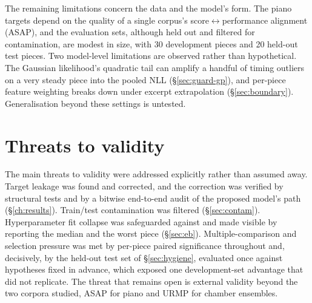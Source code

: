 The remaining limitations concern the data and the model's form. The piano
targets depend on the quality of a single corpus's
score$\leftrightarrow$performance alignment (ASAP), and the evaluation sets,
although held out and filtered for contamination, are modest in size, with
30 development pieces and 20 held-out test pieces. Two model-level
limitations are observed rather than hypothetical. The Gaussian likelihood's
quadratic tail can amplify a handful of timing outliers on a very steady
piece into the pooled NLL (\S\ref{sec:guard-gp}), and per-piece feature
weighting breaks down under excerpt extrapolation (\S\ref{sec:boundary}).
Generalisation beyond these settings is untested.

\section{Threats to validity}
The main threats to validity were addressed explicitly rather than assumed
away. Target leakage was found and corrected, and the correction was
verified by structural tests and by a bitwise end-to-end audit of the
proposed model's path (\S\ref{ch:results}). Train/test contamination was
filtered (\S\ref{sec:contam}). Hyperparameter fit collapse was safeguarded
against and made visible by reporting the median and the worst piece
(\S\ref{sec:eb}). Multiple-comparison and selection pressure was met by
per-piece paired significance throughout and, decisively, by the held-out
test set of \S\ref{sec:hygiene}, evaluated once against hypotheses fixed in
advance, which exposed one development-set advantage that did not replicate.
The threat that remains open is external validity beyond the two corpora
studied, ASAP for piano and URMP for chamber ensembles.

